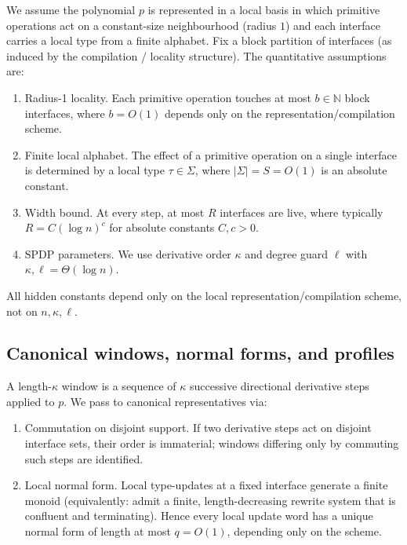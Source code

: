 \documentclass[12pt]{article}
\theoremstyle{definition}
\theoremstyle{remark}
\begin{document}
We assume the polynomial $p$ is represented in a local basis in which primitive operations
act on a constant-size neighbourhood (radius $1$) and each interface carries a local type from
a finite alphabet. Fix a block partition of interfaces (as induced by the compilation / locality
structure). The quantitative assumptions are:

\begin{enumerate}
\item[(A1)] Radius-1 locality.
Each primitive operation touches at most $b\in\mathbb{N}$ block interfaces, where
$b = O(1)$ depends only on the representation\slash compilation scheme.

\item[(A2)] Finite local alphabet.
The effect of a primitive operation on a single interface is determined by a local type
$\tau \in \Sigma$, where $|\Sigma| = S = O(1)$ is an absolute constant.

\item[(A3)] Width bound.
At every step, at most $R$ interfaces are live, where typically $R = C(\log n)^c$ for absolute
constants $C,c>0$.

\item[(A4)] SPDP parameters.
We use derivative order $\kappa$ and degree guard $\ell$ with $\kappa,\ell = \Theta(\log n)$.
\end{enumerate}

All hidden constants depend only on the local representation\slash compilation scheme, not on
$n,\kappa,\ell$.

\subsection{Canonical windows, normal forms, and profiles}
\label{subsec:canonical-windows-profiles}

A length-$\kappa$ window is a sequence of $\kappa$ successive directional derivative steps applied to $p$.
We pass to canonical representatives via:

\begin{enumerate}
\item[(C1)] Commutation on disjoint support.
If two derivative steps act on disjoint interface sets, their order is immaterial; windows differing
only by commuting such steps are identified.

\item[(C2)] Local normal form.
Local type-updates at a fixed interface generate a finite monoid (equivalently: admit a finite,
length-decreasing rewrite system that is confluent and terminating). Hence every local update word
has a unique normal form of length at most $q = O(1)$, depending only on the scheme.
\end{enumerate}
\end{document}
